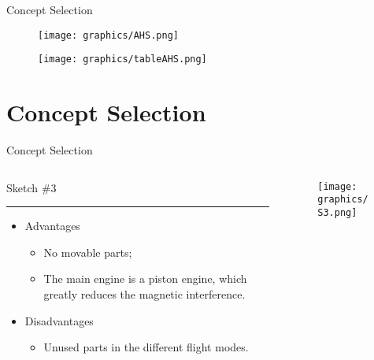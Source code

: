 \begin{frame}{Concept Selection}
    \begin{figure}
        \texttt{[image: graphics/AHS.png]}
    \end{figure}   
    \vspace{-0.6cm}
     \begin{figure}
        \texttt{[image: graphics/tableAHS.png]}
    \end{figure} 
    
    
\end{frame}

\section{Concept Selection}
\begin{frame}{Concept Selection}
    \begin{columns}[T] %
        \begin{column}{.48\textwidth}
        Sketch $\#3$ 
        \color{black}\rule{\linewidth}{1pt}
        \begin{itemize}
           \item Advantages
           \begin{itemize}
               \item[\Checkmark] No movable parts;
               \item[\Checkmark] The main engine is a piston engine, which greatly reduces the magnetic interference.
           \end{itemize}
           \item Disadvantages
           \begin{itemize}
               \item[\XSolidBrush] Unused parts in the different flight modes.
           \end{itemize}
        \end{itemize}
        \end{column}%
        \hfill%
        \begin{column}{.48\textwidth}
        \begin{figure}
	    \texttt{[image: graphics/S3.png]}
        \end{figure}
        \end{column}%
    \end{columns}
\end{frame}

